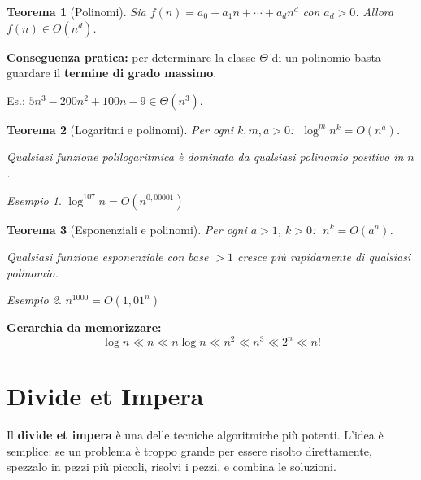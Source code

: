 \documentclass[a4paper, 11pt]{article}
\newtheorem{teorema}{Teorema}[section]
\theoremstyle{definition}
\theoremstyle{remark}
\newtheorem{esempio}{Esempio}[section]
\theoremstyle{remark}
\newenvironment{nota}{%
	\begin{tcolorbox}[
		colback=codebg,
		colframe=primary,
		fonttitle=\bfseries,
		title=Nota,
		left=6pt, right=6pt, top=4pt, bottom=4pt
		]
	}{%
	\end{tcolorbox}
}
\begin{document}
	\begin{teorema}[Polinomi]
		Sia $f(n) = a_0 + a_1 n + \cdots + a_d n^d$ con $a_d > 0$.
		Allora $f(n) \in \Theta(n^d)$.
	\end{teorema}
	
	\begin{nota}
		\textbf{Conseguenza pratica:} per determinare la classe $\Theta$
		di un polinomio basta guardare il \textbf{termine di grado massimo}.
		
		Es.: $5n^3 - 200n^2 + 100n - 9 \in \Theta(n^3)$.
	\end{nota}
	
	\begin{teorema}[Logaritmi e polinomi]
		Per ogni $k,m,a > 0$: $\;\log^m n^k = O(n^a)$.
		
		Qualsiasi funzione polilogaritmica è dominata da qualsiasi
		polinomio positivo in $n$.
	\end{teorema}
	
	\begin{esempio}
		$\log^{107} n = O(n^{0{,}00001})$
	\end{esempio}
	
	\begin{teorema}[Esponenziali e polinomi]
		Per ogni $a>1$, $k>0$: $\;n^k = O(a^n)$.
		
		Qualsiasi funzione esponenziale con base $>1$ cresce più
		rapidamente di qualsiasi polinomio.
	\end{teorema}
	
	\begin{esempio}
		$n^{1000} = O(1{,}01^n)$
	\end{esempio}
	
	\begin{hardnote}
		\textbf{Gerarchia da memorizzare:}
		\[
		\log n \ll n \ll n\log n \ll n^2 \ll n^3
		\ll 2^n \ll n!
		\]
	\end{hardnote}
	
	\section{Divide et Impera}
	
	\begin{softnote}
		Il \textbf{divide et impera} è una delle tecniche algoritmiche
		più potenti. L'idea è semplice: se un problema è troppo grande
		per essere risolto direttamente, spezzalo in pezzi più piccoli,
		risolvi i pezzi, e combina le soluzioni.
	\end{softnote}
	
\end{document}
